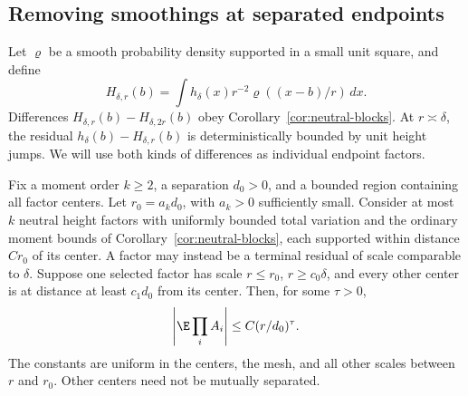 \subsection{Removing smoothings at separated endpoints}

Let \(\varrho\) be a smooth probability density supported in a small
unit square, and define
\[
 H_{\delta,r}(b)=\int h_\delta(x)r^{-2}
                   \varrho((x-b)/r)\,dx.
\]
Differences \(H_{\delta,r}(b)-H_{\delta,2r}(b)\) obey
Corollary~\ref{cor:neutral-blocks}. At \(r\asymp\delta\), the residual
\(h_\delta(b)-H_{\delta,r}(b)\) is deterministically bounded by unit
height jumps. We will use both kinds of differences as individual
endpoint factors.

\begin{lemma}\label{lem:separated-block}
Fix a moment order \(k\ge2\), a separation \(d_0>0\), and a bounded
region containing all factor centers. Let \(r_0=a_kd_0\), with \(a_k>0\)
sufficiently small. Consider at most \(k\) neutral height factors with
uniformly bounded total variation and the ordinary moment bounds of
Corollary~\ref{cor:neutral-blocks}, each supported within distance
\(Cr_0\) of its center. A factor may instead be a terminal residual of
scale comparable to \(\delta\). Suppose one selected factor has scale
\(r\le r_0\), \(r\ge c_0\delta\), and every other center is at distance
at least \(c_1d_0\) from its center. Then, for some \(\tau>0\),
\begin{equation}\label{eq:prob-separated-block}
 \left|\E\prod_i A_i\right|
 \le C(r/d_0)^\tau.
\end{equation}
The constants are uniform in the centers, the mesh, and all other scales
between \(r\) and \(r_0\). Other centers need not be mutually separated.
\end{lemma}

